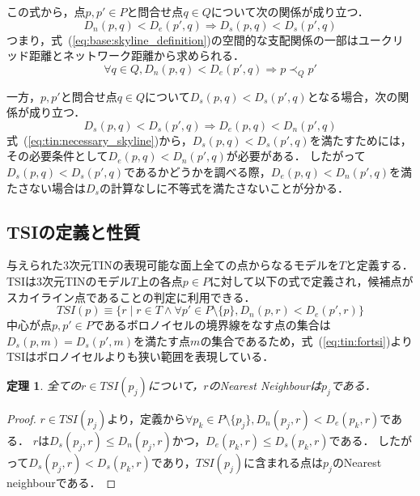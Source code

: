 \documentclass{fit}
\newtheorem{theorem}{定理}
\theoremstyle{definition}
\newcommand{\Eq}[1]{式~(#1)}
\begin{document}
この式から，点$p, p' \in P$と問合せ点$q \in Q$について次の関係が成り立つ．
\begin{equation}
  \label{eq:tin:fortsi}
  D_n(p,q) < D_e(p',q) \Rightarrow D_s(p,q) < D_s(p',q)
\end{equation}
つまり，\Eq{\ref{eq:base:skyline_definition}}の空間的な支配関係の一部はユークリッド距離とネットワーク距離から求められる．
\begin{equation}
  \label{eq:tin:sufficient_skyline}
  \forall q \in Q, D_n(p,q) < D_e(p',q) \Rightarrow p \prec_Q p'
\end{equation}

一方，$p,p'$と問合せ点$q \in Q$について$D_s(p,q) < D_s(p',q)$となる場合，次の関係が成り立つ．
\begin{equation}
  \label{eq:tin:necessary_skyline}
  D_s(p,q) < D_s(p',q) \Rightarrow D_e(p,q) < D_n(p',q)
\end{equation}
\Eq{\ref{eq:tin:necessary_skyline}}から，$D_s(p,q) < D_s(p',q)$を満たすためには，その必要条件として$D_e(p,q) < D_n(p',q)$が必要がある．
したがって$D_s(p,q) < D_s(p',q)$であるかどうかを調べる際，$D_e(p,q) < D_n(p',q)$を満たさない場合は$D_s$の計算なしに不等式を満たさないことが分かる．

\subsection{TSIの定義と性質}

与えられた3次元TINの表現可能な面上全ての点からなるモデルを$T$と定義する．
TSIは3次元TINのモデル$T$上の各点$p \in P$に対して以下の式で定義され，候補点がスカイライン点であることの判定に利用できる．
\begin{equation}
  TSI(p) \equiv \{ r \mid r \in T \wedge \forall p' \in P \setminus \{p\}, D_n(p,r) < D_e(p',r) \}
\end{equation}
中心が点$p, p' \in P$であるボロノイセルの境界線をなす点の集合は$D_s(p, m) = D_s(p', m)$を満たす点$m$の集合であるため，\Eq{\ref{eq:tin:fortsi}}よりTSIはボロノイセルよりも狭い範囲を表現している．

\begin{theorem}
  \label{theorem:tsinn}
  全ての$r \in TSI(p_j)$について，$r$のNearest Neighbourは$p_j$である．
\end{theorem}

\begin{proof}
  $r \in TSI(p_j)$より，定義から$\forall p_k \in P \setminus \{p_j\}, D_n(p_j,r) < D_e(p_k, r)$である．
  $r$は$D_s(p_j,r) \leq D_n(p_j,r)$かつ，$D_e(p_k,r) \leq D_s(p_k,r)$である．
  したがって$D_s(p_j,r)<D_s(p_k,r)$であり，$TSI(p_j)$に含まれる点は$p_j$のNearest neighbourである．
\end{proof}
\end{document}
